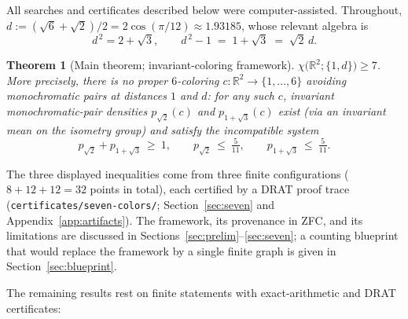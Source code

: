 \documentclass[11pt]{article}
\newtheorem{theorem}{Theorem}[section]
\theoremstyle{definition}
\theoremstyle{remark}
\newcommand{\R}{\mathbb{R}}
\newcommand{\dd}{d}                          %
\newcommand{\chid}[1]{\chi\bigl(\R^2;#1\bigr)}
\begin{document}
All searches and certificates described below were computer-assisted.
Throughout, $\dd:=(\sqrt6+\sqrt2)/2=2\cos(\pi/12)\approx
1.93185$, whose relevant algebra is
\begin{equation}\label{eq:identity}
  \dd^{\,2}=2+\sqrt3,
  \qquad
  \dd^{\,2}-1 \;=\; 1+\sqrt3 \;=\; \sqrt2\,\dd .
\end{equation}

\begin{theorem}[Main theorem; invariant-coloring framework]\label{thm:main}
$\chid{\{1,\dd\}}\ge 7$.  More precisely, there is no proper $6$-coloring
$c\colon\R^2\to\{1,\dots,6\}$ avoiding monochromatic pairs at distances
$1$ and $\dd$: for any such $c$, invariant monochromatic-pair densities
$p_{\sqrt2}(c)$ and $p_{1+\sqrt3}(c)$ exist (via an invariant mean on the
isometry group) and satisfy the incompatible system
\[
  p_{\sqrt2}+p_{1+\sqrt3}\ \ge\ 1,
  \qquad
  p_{\sqrt2}\ \le\ \tfrac{5}{11},
  \qquad
  p_{1+\sqrt3}\ \le\ \tfrac{5}{11}.
\]
\end{theorem}

The three displayed inequalities come from three finite configurations
($8+12+12=32$ points in total), each certified by a DRAT proof trace
(\texttt{certificates/seven-colors/}; Section~\ref{sec:seven} and
Appendix~\ref{app:artifacts}).  The framework, its provenance in ZFC, and
its limitations are discussed in
Sections~\ref{sec:prelim}--\ref{sec:seven}; a counting blueprint that
would replace the framework by a single finite graph is given in
Section~\ref{sec:blueprint}.

The remaining results rest on finite statements with exact-arithmetic
and DRAT certificates:
\end{document}

